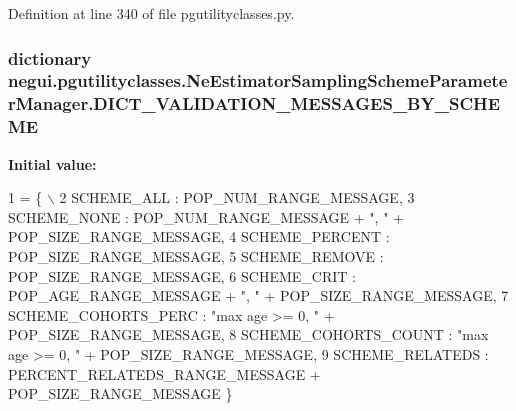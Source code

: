 Definition at line 340 of file pgutilityclasses.\+py.

\subsubsection[{\texorpdfstring{D\+I\+C\+T\+\_\+\+V\+A\+L\+I\+D\+A\+T\+I\+O\+N\+\_\+\+M\+E\+S\+S\+A\+G\+E\+S\+\_\+\+B\+Y\+\_\+\+S\+C\+H\+E\+ME}{DICT_VALIDATION_MESSAGES_BY_SCHEME}}]{\setlength{\rightskip}{0pt plus 5cm}dictionary negui.\+pgutilityclasses.\+Ne\+Estimator\+Sampling\+Scheme\+Parameter\+Manager.\+D\+I\+C\+T\+\_\+\+V\+A\+L\+I\+D\+A\+T\+I\+O\+N\+\_\+\+M\+E\+S\+S\+A\+G\+E\+S\+\_\+\+B\+Y\+\_\+\+S\+C\+H\+E\+ME\hspace{0.3cm}{\ttfamily [static]}}\hypertarget{classnegui_1_1pgutilityclasses_1_1NeEstimatorSamplingSchemeParameterManager_ac0236ece2559b6f7e53019ac5593f57c}{}\label{classnegui_1_1pgutilityclasses_1_1NeEstimatorSamplingSchemeParameterManager_ac0236ece2559b6f7e53019ac5593f57c}
{\bfseries Initial value\+:}
\begin{DoxyCode}
1 = \{ \(\backslash\)
2                     SCHEME\_ALL :  POP\_NUM\_RANGE\_MESSAGE,
3                     SCHEME\_NONE : POP\_NUM\_RANGE\_MESSAGE + \textcolor{stringliteral}{", "} + POP\_SIZE\_RANGE\_MESSAGE,                
4                     SCHEME\_PERCENT : POP\_SIZE\_RANGE\_MESSAGE,
5                     SCHEME\_REMOVE : POP\_SIZE\_RANGE\_MESSAGE,
6                     SCHEME\_CRIT : POP\_AGE\_RANGE\_MESSAGE + \textcolor{stringliteral}{", "} + POP\_SIZE\_RANGE\_MESSAGE,
7                     SCHEME\_COHORTS\_PERC : \textcolor{stringliteral}{"max age >= 0, "} + POP\_SIZE\_RANGE\_MESSAGE,
8                     SCHEME\_COHORTS\_COUNT : \textcolor{stringliteral}{"max age >= 0, "} + POP\_SIZE\_RANGE\_MESSAGE,
9                     SCHEME\_RELATEDS : PERCENT\_RELATEDS\_RANGE\_MESSAGE + POP\_SIZE\_RANGE\_MESSAGE \}
\end{DoxyCode}


